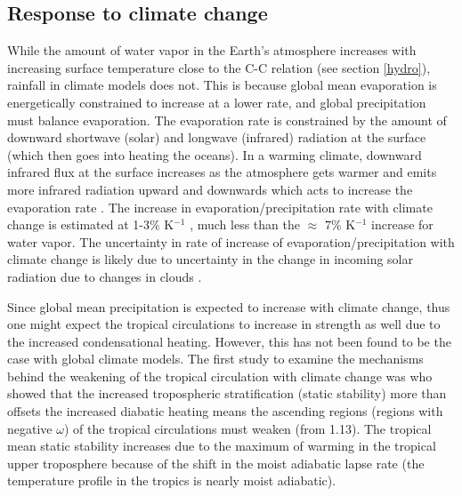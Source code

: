 \documentclass[letterpaper,12pt,titlepage,oneside,final]{book}
\begin{document}
\subsection{Response to climate change}\label{response}

While the amount of water vapor in the Earth's atmosphere increases with increasing surface temperature close to the C-C relation (see section \ref{hydro}), rainfall in climate models does not. This is because global mean evaporation is energetically constrained to increase at a lower rate, and global precipitation must balance evaporation. The evaporation rate is constrained by the amount of downward shortwave (solar) and longwave (infrared) radiation at the surface (which then goes into heating the oceans). In a warming climate, downward infrared flux at the surface increases as the atmosphere gets warmer and emits more infrared radiation upward and downwards which acts to increase the evaporation rate \citep{boer_climate_1993}. The increase in evaporation/precipitation rate with climate change is estimated at 1-3$\%$ K$^{-1}$ \citep{schneider_water_2010,he_anthropogenic_2015,boer_climate_1993}, much less than the $\approx$ $7 \%$ K$^{-1}$ increase for water vapor. The uncertainty in rate of increase of evaporation/precipitation with climate change is likely due to uncertainty in the change in incoming solar radiation due to changes in clouds \citep{allen_constraints_2002}.

Since global mean precipitation is expected to increase with climate change, thus one might expect the tropical circulations to increase in strength as well due to the increased condensational heating. However, this has not been found to be the case with global climate models. The first study to examine the mechanisms behind the weakening of the tropical circulation with climate change was \citep{knutson_time-mean_1995} who showed that the increased tropospheric stratification (static stability) more than offsets the increased diabatic heating means the ascending regions (regions with negative $\omega$) of the tropical circulations must weaken (from 1.13). The tropical mean static stability increases due to the maximum of warming in the tropical upper troposphere because of the shift in the moist adiabatic lapse rate (the temperature profile in the tropics is nearly moist adiabatic).
\end{document}
